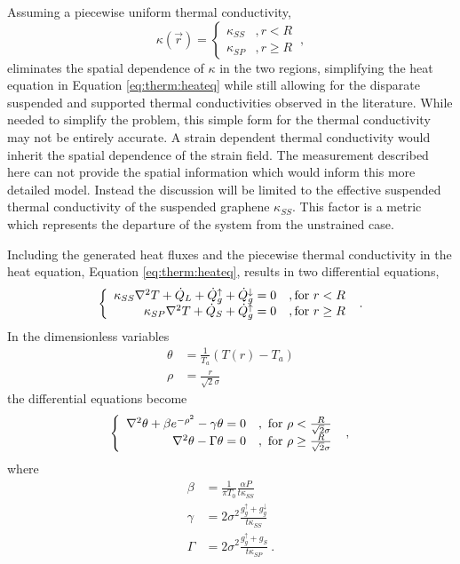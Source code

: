 Assuming a piecewise uniform thermal conductivity,
\begin{equation*}
	\kappa (\vec{r})=\left \{ \begin{array}{ll} \kappa_{SS} & , r<R \\ \kappa_{SP} & , r \geq R \end{array} \right. \ ,
\end{equation*}
eliminates the spatial dependence of $\kappa$ in the two regions, simplifying the heat equation in Equation \ref{eq:therm:heateq} while still allowing for the disparate suspended and supported thermal conductivities observed in the literature.
While needed to simplify the problem, this simple form for the thermal conductivity may not be entirely accurate. 
A strain dependent thermal conductivity would inherit the spatial dependence of the strain field.
The measurement described here can not provide the spatial information which would inform this more detailed model.
Instead the discussion will be limited to the effective suspended thermal conductivity of the suspended graphene $\kappa_{SS}$.
This factor is a metric which represents the departure of the system from the unstrained case.

Including the generated heat fluxes and the piecewise thermal conductivity in the heat equation, Equation \ref{eq:therm:heateq}, results in two differential equations, 
\begin{equation*}
	\left\{
	\begin{array}{r l}
	\kappa_{SS} \nabla^2 T+\dot{Q}_L + \dot{Q}_g^{\uparrow} + \dot{Q}_g^{\downarrow}=0 & , \textrm{for } r<R \\
	\kappa_{SP} \nabla^2 T+\dot{Q}_S + \dot{Q}_g^{\uparrow}=0 & , \textrm{for } r \geq R
	\end{array}
	\right. \ .
\end{equation*}
In the dimensionless variables
\begin{align*}
	\theta&= \frac{1}{T_a} (T(r)-T_a) \\
	\rho&=\frac{r}{\sqrt{2} \sigma}
\end{align*}
the differential equations become
\begin{equation*}
	\left\{
	\begin{array}{r l}
	\nabla^2 \theta + \beta e^{-\rho^2} - \gamma \theta =0 & , \ \textrm{for } \rho < \frac{R}{\sqrt{2} \sigma} \\
	\nabla^2 \theta - \Gamma \theta =0 & , \ \textrm{for } \rho \geq \frac{R}{\sqrt{2} \sigma}
	\end{array}
	\right. \ , \\
\end{equation*}
where
\begin{align*}
	\beta &=\frac{1}{\pi T_0} \frac{\alpha P}{t \kappa_{SS}}\\
	\gamma&=2 \sigma^2 \frac{g_g^{\uparrow}+g_g^{\downarrow}}{t \kappa_{SS}} \\
	\Gamma&=2 \sigma^2 \frac{g_g^{\uparrow}+g_S             }{t \kappa_{SP}} \ .
\end{align*}

